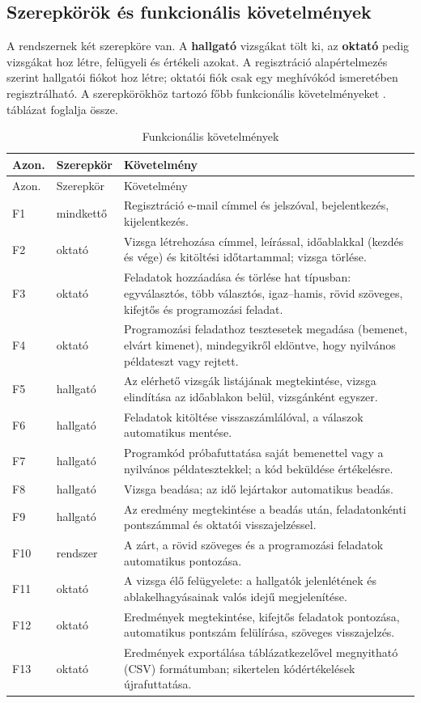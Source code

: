 \subsection{Szerepkörök és funkcionális követelmények}

A rendszernek két szerepköre van. A \textbf{hallgató} vizsgákat tölt ki, az \textbf{oktató} pedig
vizsgákat hoz létre, felügyeli és értékeli azokat. A regisztráció alapértelmezés szerint hallgatói
fiókot hoz létre; oktatói fiók csak egy meghívókód ismeretében regisztrálható. A szerepkörökhöz
tartozó főbb funkcionális követelményeket . táblázat foglalja össze.

\begin{longtable}{@{}lp{1.9cm}p{10.9cm}@{}}
  \caption{Funkcionális követelmények}\label{tab:funkcionalis}\\
  \toprule
  Azon. & Szerepkör & Követelmény \\
  \midrule
  \endfirsthead
  \toprule
  Azon. & Szerepkör & Követelmény \\
  \midrule
  \endhead
  F1  & mindkettő & Regisztráció e-mail címmel és jelszóval, bejelentkezés, kijelentkezés. \\
  F2  & oktató    & Vizsga létrehozása címmel, leírással, időablakkal (kezdés és vége) és kitöltési időtartammal; vizsga törlése. \\
  F3  & oktató    & Feladatok hozzáadása és törlése hat típusban: egyválasztós, több választós, igaz--hamis, rövid szöveges, kifejtős és programozási feladat. \\
  F4  & oktató    & Programozási feladathoz tesztesetek megadása (bemenet, elvárt kimenet), mindegyikről eldöntve, hogy nyilvános példateszt vagy rejtett. \\
  F5  & hallgató  & Az elérhető vizsgák listájának megtekintése, vizsga elindítása az időablakon belül, vizsgánként egyszer. \\
  F6  & hallgató  & Feladatok kitöltése visszaszámlálóval, a válaszok automatikus mentése. \\
  F7  & hallgató  & Programkód próbafuttatása saját bemenettel vagy a nyilvános példatesztekkel; a kód beküldése értékelésre. \\
  F8  & hallgató  & Vizsga beadása; az idő lejártakor automatikus beadás. \\
  F9  & hallgató  & Az eredmény megtekintése a beadás után, feladatonkénti pontszámmal és oktatói visszajelzéssel. \\
  F10 & rendszer  & A zárt, a rövid szöveges és a programozási feladatok automatikus pontozása. \\
  F11 & oktató    & A vizsga élő felügyelete: a hallgatók jelenlétének és ablakelhagyásainak valós idejű megjelenítése. \\
  F12 & oktató    & Eredmények megtekintése, kifejtős feladatok pontozása, automatikus pontszám felülírása, szöveges visszajelzés. \\
  F13 & oktató    & Eredmények exportálása táblázatkezelővel megnyitható (CSV) formátumban; sikertelen kódértékelések újrafuttatása. \\
  \bottomrule
\end{longtable}

